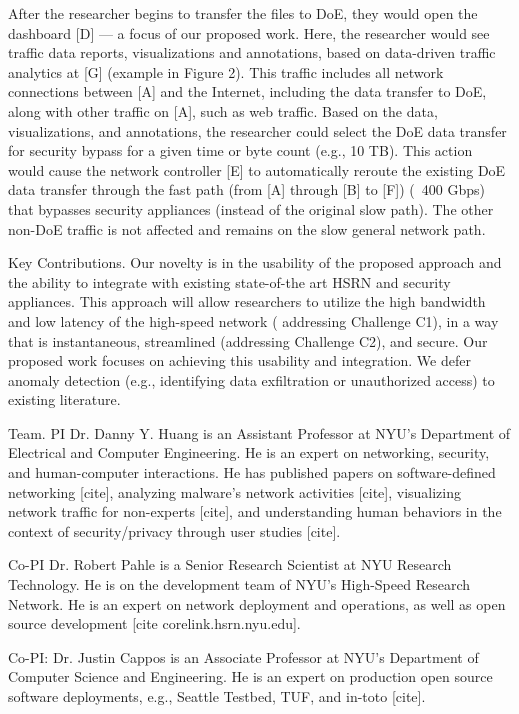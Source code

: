 After the researcher begins to transfer the files to DoE, they would open the dashboard [D] — a focus of our proposed work. Here, the researcher would see traffic data reports, visualizations and annotations, based on data-driven traffic analytics at [G] (example in Figure 2). This traffic includes all network connections between [A] and the Internet, including the data transfer to DoE, along with other traffic on [A], such as web traffic. Based on the data, visualizations, and annotations, the researcher could select the DoE data transfer for security bypass for a given time or byte count (e.g., 10 TB). This action would cause the network controller [E] to automatically reroute  the existing DoE data transfer through the fast path (from [A] through [B] to [F]) (~400 Gbps) that bypasses security appliances (instead of the original slow path). The other non-DoE traffic is not affected and remains on the slow general network path.

Key Contributions. Our novelty is in the usability of the proposed approach and the ability to integrate with existing state-of-the art HSRN and security appliances. This approach will allow researchers to utilize the high bandwidth and low latency of the high-speed network ( addressing Challenge C1), in a way that is instantaneous, streamlined (addressing Challenge C2), and secure. Our proposed work focuses on achieving this usability and integration. We defer anomaly detection (e.g., identifying data exfiltration or unauthorized access) to existing literature.

Team. PI Dr. Danny Y. Huang is an Assistant Professor at NYU’s Department of Electrical and Computer Engineering. He is an expert on networking, security, and human-computer interactions. He has published papers on software-defined networking [cite], analyzing malware’s network activities [cite], visualizing network traffic for non-experts [cite], and understanding human behaviors in the context of security/privacy through user studies [cite].

Co-PI Dr. Robert Pahle is a Senior Research Scientist at NYU Research Technology. He is on the development team of NYU’s High-Speed Research Network. He is an expert on network deployment and operations, as well as open source development [cite corelink.hsrn.nyu.edu].

Co-PI: Dr. Justin Cappos is an Associate Professor at NYU’s Department of Computer Science and Engineering. He is an expert on production open source software deployments, e.g., Seattle Testbed, TUF, and in-toto [cite].

